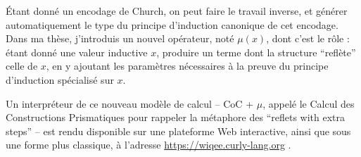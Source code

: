 \documentclass[]{article}
\begin{document}
Étant donné un encodage de Church, on peut faire le travail inverse, et
générer automatiquement le type du principe d'induction canonique de cet
encodage. Dans ma thèse, j'introduis un nouvel opérateur, noté
\(\mu(x)\), dont c'est le rôle : étant donné une valeur inductive \(x\),
produire un terme dont la structure ``reflète'' celle de \(x\), en y
ajoutant les paramètres nécessaires à la preuve du principe d'induction
spécialisé sur \(x\).

Un interpréteur de ce nouveau modèle de calcul -- CoC + \(\mu\), appelé
le Calcul des Constructions Prismatiques pour rappeler la métaphore des
``reflets with extra steps'' -- est rendu disponible sur une plateforme
Web interactive, ainsi que sous une forme plus classique, à l'adresse
\url{https://wiqee.curly-lang.org} .
\end{document}
